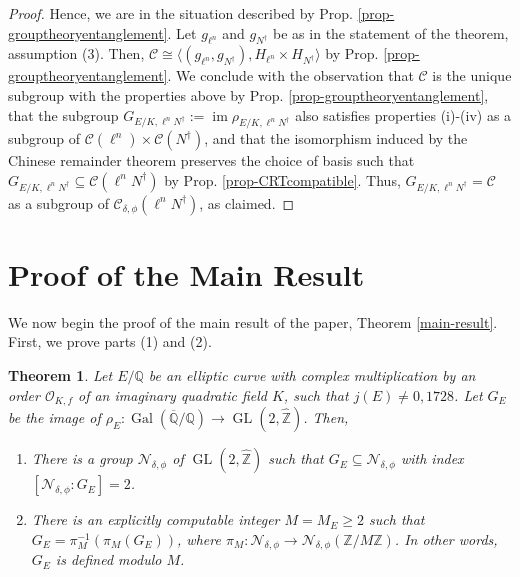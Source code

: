 \documentclass[11pt]{amsart}
\newtheorem{thm}[defn]{Theorem}
\theoremstyle{definition}
\newcommand{\Q}{\mathbb{Q}}
\newcommand{\Z}{\mathbb{Z}}
\newcommand{\Of}{\mathcal{O}_{K,f}}
\newcommand{\cC}{\mathcal{C}}
\newcommand{\Rats}{\mathbb{Q}}
\newcommand{\Gal}{\operatorname{Gal}}
\newcommand{\GQ}{\Gal(\overline{\Rats}/\Rats)}
\newcommand{\GL}{\operatorname{GL}}
\DeclareMathOperator{\im}{im}  %
\begin{document}
\begin{proof}
Hence, we are in the situation described by Prop. \ref{prop-grouptheoryentanglement}. Let $g_{\ell^n}$ and $g_{N^\dagger}$ be as in the statement of the theorem, assumption (3). Then, $\cC \cong \langle (g_{\ell^n},g_{N^\dagger}),H_{\ell^n}\times H_{N^\dagger} \rangle$ by Prop. \ref{prop-grouptheoryentanglement}. We conclude with the observation that $\mathcal{C}$ is the unique subgroup with the properties above by Prop. \ref{prop-grouptheoryentanglement}, that the subgroup $G_{E/K, \ell^n N^\dagger} := \im \rho_{E/K, \ell^n N^\dagger}$ also satisfies properties (i)-(iv) as a subgroup of $\cC(\ell^n)\times \cC(N^\dagger)$, and that the isomorphism induced by the Chinese remainder theorem preserves the choice of basis such that $G_{E/K, \ell^n N^\dagger} \subseteq \mathcal{C}(\ell^n N^\dagger)$ by Prop. \ref{prop-CRTcompatible}. Thus, $G_{E/K, \ell^n N^\dagger} = \mathcal{C}$ as a subgroup of $\cC_{\delta, \phi}(\ell^n N^\dagger)$, as claimed.
\end{proof}


\section{Proof of the Main Result}\label{sec-proofofmaintheorem}

We now begin the proof of the main result of the paper, Theorem \ref{main-result}. First, we prove parts (1) and (2).


\begin{thm}\label{thm-main}
    Let $E/\Q$ be an elliptic curve with complex multiplication by an order $\Of$ of an imaginary quadratic field $K$, such that $j(E)\neq 0,1728$. Let $G_E$ be the image of $\rho_E\colon \GQ\to \GL(2,\widehat{\Z})$. Then,
    \begin{enumerate}
        \item There is a group $\mathcal{N}_{\delta,\phi}$ of $\GL(2,\widehat{\Z})$ such that $G_E\subseteq\mathcal{N}_{\delta,\phi}$ with index $[\mathcal{N}_{\delta,\phi}:G_E]=2$. 
        \item There is an explicitly computable integer $M=M_E\geq 2$ such that $G_E=\pi_M^{-1}(\pi_M(G_E))$, where $\pi_M\colon \mathcal{N}_{\delta,\phi}\to \mathcal{N}_{\delta,\phi}(\Z/M\Z)$. In other words, $G_E$ is defined modulo $M$.
    \end{enumerate}
\end{thm}
\end{document}

